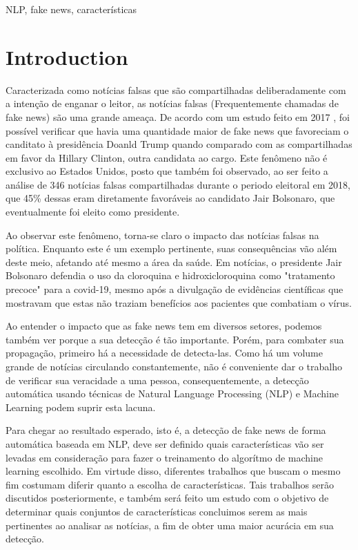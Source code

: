 \documentclass[conference]{IEEEtran}
\begin{document}
\begin{IEEEkeywords}
NLP, fake news, características
\end{IEEEkeywords}

\section{Introduction}
Caracterizada como notícias falsas que são compartilhadas deliberadamente com a intenção de enganar o leitor, as notícias falsas (Frequentemente chamadas de fake news) são uma grande ameaça. De acordo com um estudo feito em 2017 \cite{b1}, foi possível verificar que havia uma quantidade maior de fake news que favoreciam o canditato à presidência Doanld Trump quando comparado com as compartilhadas em favor da Hillary Clinton, outra candidata ao cargo. Este fenômeno não é exclusivo ao Estados Unidos, posto que também foi observado, ao ser feito a análise de 346 notícias falsas \cite{b2} compartilhadas durante o periodo eleitoral em 2018, que 45\% dessas eram diretamente favoráveis ao candidato Jair Bolsonaro, que eventualmente foi eleito como presidente.

Ao observar este fenômeno, torna-se claro o impacto das notícias falsas na política. Enquanto este é um exemplo pertinente, suas consequências vão além deste meio, afetando até mesmo a área da saúde. Em notícias, o presidente Jair Bolsonaro defendia o uso da cloroquina e hidroxicloroquina como "tratamento precoce" para a covid-19, mesmo após a divulgação de evidências científicas que mostravam que estas não traziam benefícios aos pacientes que combatiam o vírus.

Ao entender o impacto que as fake news tem em diversos setores, podemos também ver porque a sua detecção é tão importante. Porém, para combater sua propagação, primeiro há a necessidade de detecta-las. Como há um volume grande de notícias circulando constantemente, não é conveniente dar o trabalho de verificar sua veracidade a uma pessoa, consequentemente, a detecção automática usando técnicas de Natural Language Processing (NLP) e Machine Learning podem suprir esta lacuna.

Para chegar ao resultado esperado, isto é, a detecção de fake news de forma automática baseada em NLP, deve ser definido quais características vão ser levadas em consideração para fazer o treinamento do algorítmo de machine learning escolhido. Em virtude disso, diferentes trabalhos que buscam o mesmo fim costumam diferir quanto a escolha de características. Tais trabalhos serão discutidos posteriormente, e também será feito um estudo com o objetivo de determinar quais conjuntos de características concluimos serem as mais pertinentes ao analisar as notícias, a fim de obter uma maior acurácia em sua detecção.
\end{document}
